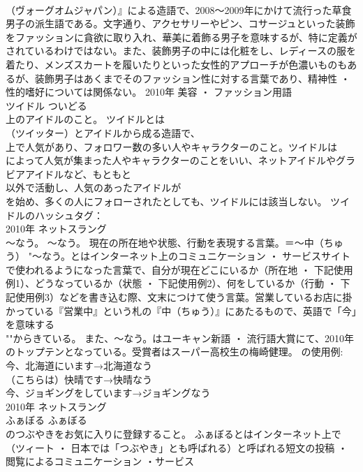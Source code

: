 \documentclass[8pt]{extreport}
\begin{document}
\begin{CJK}{UTF8}{min}
\\	（ヴォーグオムジャパン）』による造語で、2008～2009年にかけて流行った草食男子の派生語である。文字通り、アクセサリーやピン、コサージュといった装飾をファッションに貪欲に取り入れ、華美に着飾る男子を意味するが、特に定義がされているわけではない。また、装飾男子の中には化粧をし、レディースの服を着たり、メンズスカートを履いたりといった女性的アプローチが色濃いものもあるが、装飾男子はあくまでそのファッション性に対する言葉であり、精神性 ・ 性的嗜好については関係ない。	2010年	美容 ・ ファッション用語	
\\	ツイドル	ついどる	
\\	上のアイドルのこと。	ツイドルとは
\\	（ツイッター）とアイドルから成る造語で、
\\	上で人気があり、フォロワー数の多い人やキャラクターのこと。ツイドルは
\\	によって人気が集まった人やキャラクターのことをいい、ネットアイドルやグラビアアイドルなど、もともと
\\	以外で活動し、人気のあったアイドルが
\\	を始め、多くの人にフォローされたとしても、ツイドルには該当しない。 ツイドルのハッシュタグ：
\\	2010年	ネットスラング	
\\	～なう。	～なう。	現在の所在地や状態、行動を表現する言葉。＝～中（ちゅう）	"～なう。とはインターネット上のコミュニケーション ・ サービスサイト
\\	で使われるようになった言葉で、自分が現在どこにいるか（所在地 ・ 下記使用例1）、どうなっているか（状態 ・ 下記使用例2）、何をしているか（行動 ・ 下記使用例3）などを書き込む際、文末につけて使う言葉。営業しているお店に掛かっている『営業中』という札の『中（ちゅう）』にあたるもので、英語で「今」を意味する
\\	""からきている。 また、～なう。はユーキャン新語 ・ 流行語大賞にて、2010年のトップテンとなっている。受賞者はスーパー高校生の梅崎健理。 の使用例: 今、北海道にいます→北海道なう 
\\	（こちらは）快晴です→快晴なう 
\\	今、ジョギングをしています→ジョギングなう 
\\	2010年	ネットスラング	
\\	ふぁぼる	ふぁぼる	
\\	のつぶやきをお気に入りに登録すること。	ふぁぼるとはインターネット上で
\\	（ツィート ・ 日本では「つぶやき」とも呼ばれる）と呼ばれる短文の投稿 ・ 閲覧によるコミュニケーション ・サービス

\end{CJK}
\end{document}
